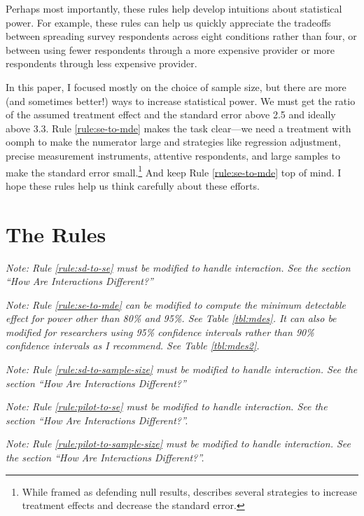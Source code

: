 \documentclass[12pt]{article}
\begin{document}
Perhaps most importantly, these rules help develop intuitions about statistical power. 
For example, these rules can help us quickly appreciate the tradeoffs between spreading survey respondents across eight conditions rather than four, or between using fewer respondents through a more expensive provider or more respondents through less expensive provider.

In this paper, I focused mostly on the choice of sample size, but there are more (and sometimes better!) ways to increase statistical power. 
We must get the ratio of the assumed treatment effect and the standard error above 2.5 and ideally above 3.3. 
Rule \ref{rule:se-to-mde} makes the task clear---we need a treatment with oomph to make the numerator large and strategies like regression adjustment, precise measurement instruments, attentive respondents, and large samples to make the standard error small.\footnote{
  While framed as defending null results, \cite{Kane2024} describes several strategies to increase treatment effects and decrease the standard error.
  }
And keep Rule \ref{rule:se-to-mde} top of mind.
I hope these rules help us think carefully about these efforts.


\singlespace
\clearpage
\small



\appendix
\doublespace


\section{The Rules}

{}
{}

{\noindent \footnotesize\textit{Note: Rule \ref{rule:sd-to-se} must be modified to handle interaction. See the section ``How Are Interactions Different?''}}



{\noindent \footnotesize \textit{Note: Rule \ref{rule:se-to-mde} can be modified to compute the minimum detectable effect for power other than 80\% and 95\%. See Table \ref{tbl:mdes}. It can also be modified for researchers using 95\% confidence intervals rather than 90\% confidence intervals as I recommend. See Table \ref{tbl:mdes2}.}}


{\noindent \footnotesize \textit{Note: Rule \ref{rule:sd-to-sample-size} must be modified to handle interaction. See the section ``How Are Interactions Different?''}}

{}
{}

{\noindent \footnotesize \textit{Note: Rule \ref{rule:pilot-to-se} must be modified to handle interaction. See the section ``How Are Interactions Different?''.}}


{\noindent \footnotesize \textit{Note: Rule \ref{rule:pilot-to-sample-size} must be modified to handle interaction. See the section ``How Are Interactions Different?''.}}

\end{document}
